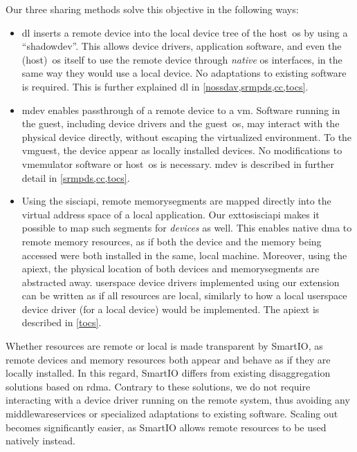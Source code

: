 \objtransparent*%
%
Our three sharing methods solve this objective in the following ways:
%
\begin{itemize}
    \item \Gls{dl} inserts a remote device into the local device tree of the \gls{host}~\gls{os} by using a ``\gls{shadowdev}''.
        This allows device drivers, application software, and even the (\gls{host})~\gls{os} itself to use the remote device through \emph{native} \gls{os} interfaces, in the same way they would use a local device.
        No adaptations to existing software is required.
        This is further explained \gls{dl} in \cref{nossdav,srmpds,cc,tocs}.
    


    \item \Gls{mdev} enables \gls{passthrough} of a remote device to a \gls{vm}.
        Software running in the \gls{guest}, including device drivers and the \gls{guest}~\gls{os}, may interact with the physical device directly, without escaping the virtualized environment.
        To the \gls{vmguest}, the device appear as locally installed devices.
        No modifications to \gls{vmemulator} software or \gls{host}~\gls{os} is necessary.
        \Gls{mdev} is described in further detail in \cref{srmpds,cc,tocs}.


    \item Using the \gls{sisciapi}, remote \glspl{memorysegment} are mapped directly into the virtual address space of a local application.
        Our \gls{exttosisciapi} makes it possible to map such \glspl{segment} for \emph{devices} as well.
        This enables native \gls{dma} to remote memory resources, as if both the device and the memory being accessed were both installed in the same, local machine.
        Moreover, using the \gls{apiext}, the physical location of both devices and \glspl{memorysegment} are abstracted away.
        \Gls{userspace} device drivers implemented using our extension can be written as if all resources are local, similarly to how a local \gls{userspace} device driver (for a local device) would be implemented.
        The \gls{apiext} is described in \cref{tocs}.
\end{itemize}
%
Whether resources are remote or local is made transparent by SmartIO, as remote devices and memory resources both appear and behave as if they are locally installed.
%
In this regard, SmartIO differs from existing \gls{disaggregation} solutions based on \gls{rdma}.
%
Contrary to these solutions, we do not require interacting with a device driver running on the remote system, thus avoiding any \glspl{middlewareservice} or specialized adaptations to existing software.
%
Scaling out becomes significantly easier, as SmartIO allows remote resources to be used natively instead.



